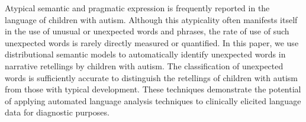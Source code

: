 Atypical semantic and pragmatic expression is frequently reported in the language of children with autism. Although this atypicality often manifests
 itself in the use of unusual or unexpected words and phrases, the rate of use
 of such unexpected words is rarely directly measured or quantified. In this
 paper, we use distributional semantic models to  automatically identify
 unexpected words in narrative retellings by children with autism.  The
 classification of unexpected words is sufficiently accurate to distinguish the
 retellings of children with autism from those with typical development. These
 techniques  demonstrate the potential of applying automated language analysis
 techniques to clinically elicited language data for diagnostic purposes.

